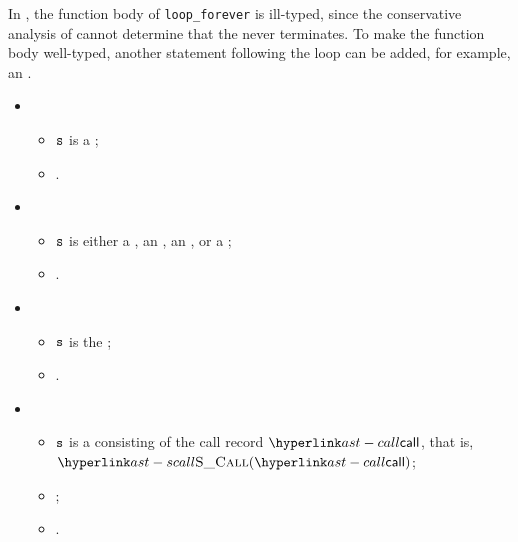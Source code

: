 In , the function body of \verb|loop_forever|
is ill-typed, since the conservative analysis of 
cannot determine that the \whilestatementterm{} never terminates.
To make the function body well-typed, another statement following the loop
can be added, for example, an \unreachablestatementterm.

\ProseParagraph
\OneApplies
\begin{itemize}
  \item {}
  \begin{itemize}
    \item $\texttt{s}$ is a \passstatementterm;
    \item {}.
  \end{itemize}

  \item {}
  \begin{itemize}
    \item $\texttt{s}$ is either a \declarationstatementterm, an \assignmentstatementterm,
          an \assertionstatementterm, or a \printstatementsterm;
    \item {}.
  \end{itemize}

  \item {}
  \begin{itemize}
    \item $\texttt{s}$ is the \unreachablestatementterm;
    \item {}.
  \end{itemize}

  \item {}
  \begin{itemize}
    \item $\texttt{s}$ is a \callstatementterm{} consisting of the call record $\call$, that is, $\SCall(\call)$;
    \item {};
    \item {}.
  \end{itemize}


\end{itemize}
